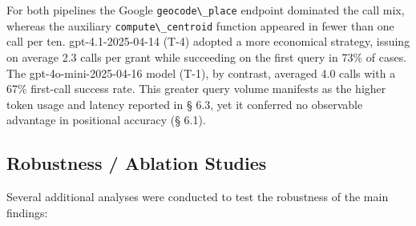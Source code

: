 For both pipelines the Google \passthrough{\lstinline!geocode\_place!}
endpoint dominated the call mix, whereas the auxiliary
\passthrough{\lstinline!compute\_centroid!} function appeared in fewer
than one call per ten. gpt-4.1-2025-04-14 (T-4) adopted a more
economical strategy, issuing on average 2.3 calls per grant while
succeeding on the first query in 73\% of cases. The
gpt-4o-mini-2025-04-16 model (T-1), by contrast, averaged 4.0 calls with
a 67\% first-call success rate. This greater query volume manifests as
the higher token usage and latency reported in § 6.3, yet it conferred
no observable advantage in positional accuracy (§ 6.1).

\subsection{Robustness / Ablation
Studies}\label{robustness-ablation-studies}

Several additional analyses were conducted to test the robustness of the
main findings:

